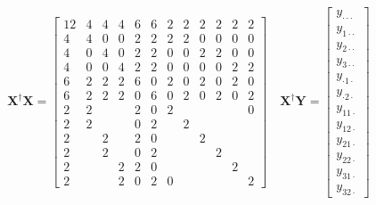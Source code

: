 \documentclass{article}
\begin{document}
\begin{equation*}
\mathbf{X}^{\dagger }\mathbf{X}=\left[ 
\begin{array}{cccccccccccc}
12 & 4 & 4 & 4 & 6 & 6 & 2 & 2 & 2 & 2 & 2 & 2 \\ 
4 & 4 & 0 & 0 & 2 & 2 & 2 & 2 & 0 & 0 & 0 & 0 \\ 
4 & 0 & 4 & 0 & 2 & 2 & 0 & 0 & 2 & 2 & 0 & 0 \\ 
4 & 0 & 0 & 4 & 2 & 2 & 0 & 0 & 0 & 0 & 2 & 2 \\ 
6 & 2 & 2 & 2 & 6 & 0 & 2 & 0 & 2 & 0 & 2 & 0 \\ 
6 & 2 & 2 & 2 & 0 & 6 & 0 & 2 & 0 & 2 & 0 & 2 \\ 
2 & 2 &  &  & 2 & 0 & 2 &  &  &  &  & 0 \\ 
2 & 2 &  &  & 0 & 2 &  & 2 &  &  &  &  \\ 
2 &  & 2 &  & 2 & 0 &  &  & 2 &  &  &  \\ 
2 &  & 2 &  & 0 & 2 &  &  &  & 2 &  &  \\ 
2 &  &  & 2 & 2 & 0 &  &  &  &  & 2 &  \\ 
2 &  &  & 2 & 0 & 2 & 0 &  &  &  &  & 2%
\end{array}%
\right] \quad \mathbf{X}^{\dagger }\mathbf{Y}=\left[ 
\begin{array}{c}
y_{\cdot \cdot \cdot } \\ 
y_{1\cdot \cdot } \\ 
y_{2\cdot \cdot } \\ 
y_{3\cdot \cdot } \\ 
y_{\cdot 1\cdot } \\ 
y_{\cdot 2\cdot } \\ 
y_{11\cdot } \\ 
y_{12\cdot } \\ 
y_{21\cdot } \\ 
y_{22\cdot } \\ 
y_{31\cdot } \\ 
y_{32\cdot }%
\end{array}%
\right]
\end{equation*}

\bigskip
\end{document}
